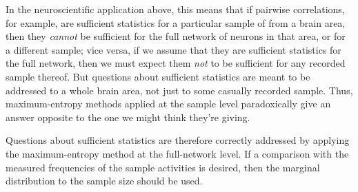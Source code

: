 \documentclass[\ifafour a4paper,12pt,\else a5paper,10pt,\fi%
onecolumn,oneside,article,%
british%
]{memoir}
\theoremstyle{remark}
\theoremstyle{innote}
\renewcommand*{\|}{\nonscript\,\vert\nonscript\;\mathopen{}}
\begin{document}
In the neuroscientific application above, this means that if pairwise
correlations, for example, are sufficient statistics for a particular
sample of from a brain area, then they \emph{cannot} be sufficient for the
full network of neurons in that area, or for a different sample; vice
versa, if we assume that they are sufficient statistics for the full
network, then we must expect them \emph{not} to be sufficient for any
recorded sample thereof. But questions about sufficient statistics are
meant to be addressed to a whole brain area, not just to some casually
recorded sample. Thus, maximum-entropy methods applied at the sample level
paradoxically give an answer opposite to the one we might think they're
giving.

Questions about sufficient statistics are therefore correctly addressed by
applying the maximum-entropy method at the full-network level. If a
comparison with the measured frequencies of the sample activities is
desired, then the marginal distribution to the sample size should be used.
\end{document}
